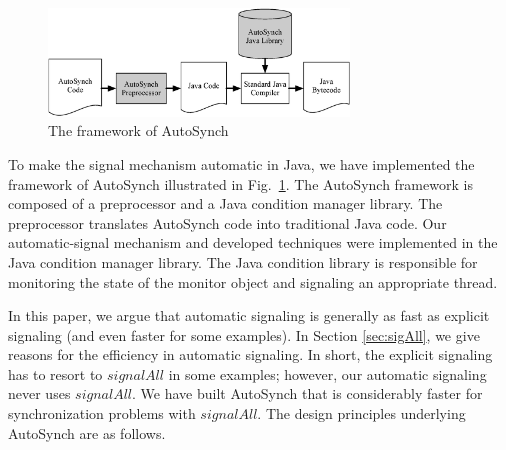 \documentclass[preprint]{sigplanconf}
\begin{document}
\begin{figure}[ht!]
  \centering
  \includegraphics[width=80mm]{fig/flow.eps}
  \caption{The framework of AutoSynch}
  \label{fig:fw}
\end{figure}


To make the signal mechanism automatic in Java, we have implemented the 
framework of AutoSynch illustrated in Fig.~\ref{fig:fw}. 
The AutoSynch framework is composed of a 
preprocessor and a Java condition manager library. The preprocessor translates 
AutoSynch code into traditional Java code. 
Our automatic-signal mechanism and 
developed techniques were implemented in the Java condition manager library. 
The Java condition library is responsible for monitoring the state of the monitor object
and signaling an appropriate thread.


%


In this paper, we argue that automatic signaling is generally as fast as explicit 
signaling (and even faster for some examples). In Section \ref{sec:sigAll}, we give reasons
for the efficiency in automatic signaling. In short, the explicit signaling has 
to resort to $signalAll$ in some examples; however, our automatic signaling never 
uses $signalAll$. We have built AutoSynch that is 
considerably faster for synchronization problems with 
$signalAll$. The design principles underlying AutoSynch are as follows.
\end{document}
